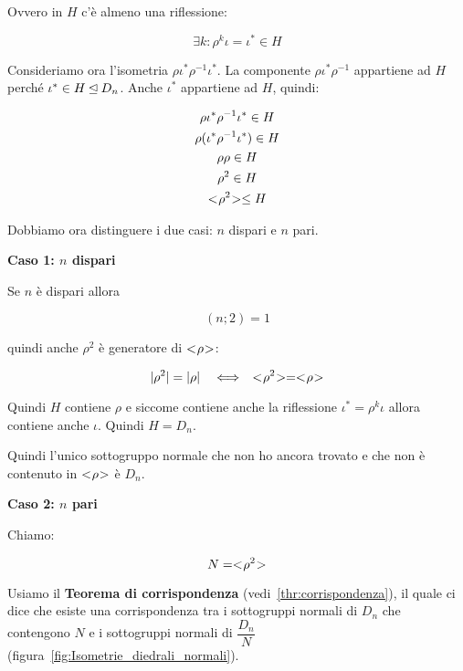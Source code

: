 	Ovvero in $H$ c'è almeno una riflessione:
	
	\begin{equation}
		\exists k : \rho^k \iota = \iota^* \in H
	\end{equation}

	Consideriamo ora l'isometria $\rho \iota^* \rho^{-1} \iota^*$. La componente $\rho \iota^* \rho^{-1}$ appartiene ad $H$ perché $\iota^* \in H \unlhd D_n$. Anche $\iota^*$ appartiene ad $H$, quindi:
	
	\begin{gather}
		\rho \iota^* \rho^{-1} \iota^* \in H \\
		\rho (\iota^* \rho^{-1} \iota^*) \in H \\
		\rho \rho \in H \\
		\rho^2 \in H \\
		< \negmedspace \rho^2 \negmedspace > \le H
	\end{gather}

	Dobbiamo ora distinguere i due casi: $n$ dispari e $n$ pari.
	
	\textbf{Caso 1: $n$ dispari}
	
	Se $n$ è dispari allora
	
	\begin{equation}
		(n; 2) = 1
	\end{equation}

	quindi anche $\rho^2$ è generatore di $< \negmedspace \rho \negmedspace >$:
	
	\begin{equation}
		\lvert \rho^2 \rvert = \lvert \rho \rvert \quad\Longleftrightarrow\quad < \negmedspace \rho^2 \negmedspace > = < \negmedspace \rho \negmedspace >
	\end{equation}
	 
	Quindi $H$ contiene $\rho$ e siccome contiene anche la riflessione $\iota^* = \rho^k \iota$ allora contiene anche $\iota$. Quindi $H = D_n$.

	Quindi l'unico sottogruppo normale che non ho ancora trovato e che non è contenuto in $< \negmedspace \rho \negmedspace >$ è $D_n$. 

	\textbf{Caso 2: $n$ pari}

	Chiamo:
	
	\begin{equation}
		N = < \negmedspace \rho^2 \negmedspace >
	\end{equation}

	Usiamo il \textbf{Teorema di corrispondenza} (vedi~\ref{thr:corrispondenza}),
	il quale ci dice che esiste una corrispondenza tra i sottogruppi normali di $D_n$ che contengono $N$ e i sottogruppi normali di $\dfrac{D_n}{N}$ (figura~\ref{fig:Isometrie_diedrali_normali}).
	
